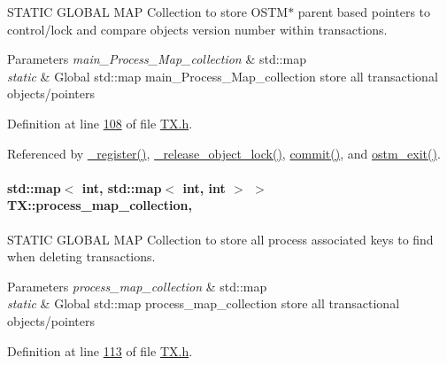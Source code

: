 S\+T\+A\+T\+IC G\+L\+O\+B\+AL M\+AP Collection to store O\+S\+T\+M$\ast$ parent based pointers to control/lock and compare objects version number within transactions. 


\begin{DoxyParams}{Parameters}
{\em main\+\_\+\+Process\+\_\+\+Map\+\_\+collection} & std\+::map\\
\hline
{\em static} & Global std\+::map main\+\_\+\+Process\+\_\+\+Map\+\_\+collection store all transactional objects/pointers \\
\hline
\end{DoxyParams}


Definition at line \hyperlink{_t_x_8h_source_l00108}{108} of file \hyperlink{_t_x_8h_source}{T\+X.\+h}.



Referenced by \hyperlink{_t_x_8cpp_source_l00104}{\+\_\+register()}, \hyperlink{_t_x_8cpp_source_l00286}{\+\_\+release\+\_\+object\+\_\+lock()}, \hyperlink{_t_x_8cpp_source_l00202}{commit()}, and \hyperlink{_t_x_8cpp_source_l00072}{ostm\+\_\+exit()}.

\paragraph[{\texorpdfstring{process\+\_\+map\+\_\+collection}{process_map_collection}}]{\setlength{\rightskip}{0pt plus 5cm}std\+::map$<$ int, std\+::map$<$ int, int $>$ $>$ T\+X\+::process\+\_\+map\+\_\+collection\hspace{0.3cm}{\ttfamily [static]}, {\ttfamily [private]}}\hypertarget{class_t_x_aea5b8eedcd5059384155576b3979a5f6_aea5b8eedcd5059384155576b3979a5f6}{}\label{class_t_x_aea5b8eedcd5059384155576b3979a5f6_aea5b8eedcd5059384155576b3979a5f6}


S\+T\+A\+T\+IC G\+L\+O\+B\+AL M\+AP Collection to store all process associated keys to find when deleting transactions. 


\begin{DoxyParams}{Parameters}
{\em process\+\_\+map\+\_\+collection} & std\+::map\\
\hline
{\em static} & Global std\+::map process\+\_\+map\+\_\+collection store all transactional objects/pointers \\
\hline
\end{DoxyParams}


Definition at line \hyperlink{_t_x_8h_source_l00113}{113} of file \hyperlink{_t_x_8h_source}{T\+X.\+h}.



